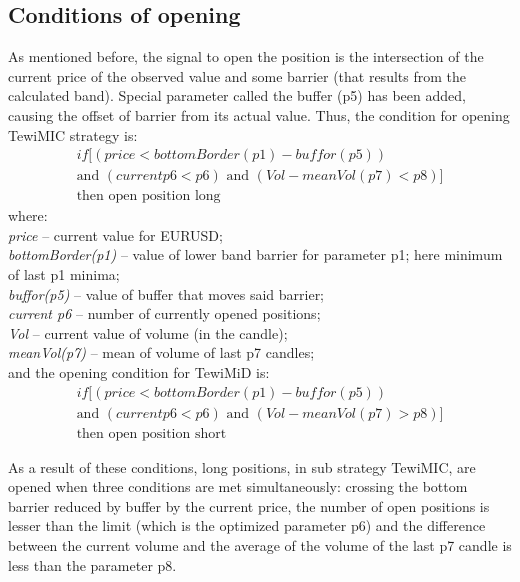 \documentclass{tewiart}
\begin{document}
\subsection{Conditions of opening}
As mentioned before, the signal to open the position is the intersection of the current price of the observed value and some barrier (that results from the calculated band). Special parameter called the buffer (p5) has been added, causing the offset of barrier from its actual value. Thus, the condition for opening TewiMIC strategy is: 
\begin{equation}
\begin{split}
if[(price < bottomBorder(p1) - buffor(p5)) \\ 
\text{and } (current p6 < p6) \text{ and } (Vol - meanVol(p7) < p8)] \\
\text{then open position long}
\end{split}
\end{equation}
where:\\
\textit{price} – current value for EURUSD;\\
\textit{bottomBorder(p1)} – value of lower band barrier for parameter p1; here minimum of last p1 minima; \\
\textit{buffor(p5)} – value of buffer that moves said barrier;\\
\textit{current p6} – number of currently opened positions;\\
\textit{Vol} – current value of volume (in the candle);\\
\textit{meanVol(p7)} – mean of volume of last p7 candles;\\

\noindent and the opening condition for TewiMiD is:
\begin{equation}
\begin{split}
if[(price < bottomBorder(p1) - buffor(p5)) \\ 
\text{and } (current p6 < p6) \text{ and } (Vol - meanVol(p7) > p8)] \\
\text{then open position short}
\end{split}
\end{equation}

As a result of these conditions, long positions, in sub strategy TewiMIC, are opened when three conditions are met simultaneously: crossing the bottom barrier reduced by buffer by the current price, the number of open positions is lesser than the limit (which is the optimized parameter p6) and the difference between the current volume and the average of the volume of the last p7 candle is less than the parameter p8.\\
\end{document}
